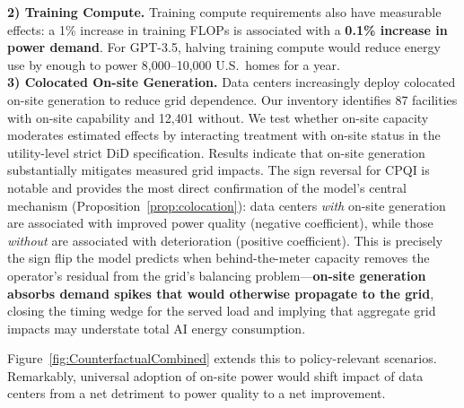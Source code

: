 \documentclass[a4paper,fleqn,longmktitle]{cas-sc}
\newcommand{\nb}[1]{\textcolor{blue}{NB[#1]}}
\theoremstyle{plain}
\theoremstyle{definition}
\begin{document}
\noindent\textbf{2) Training Compute.} Training compute requirements also have measurable effects: a 1\% increase in training FLOPs is associated with a \textbf{0.1\% increase in power demand}. For GPT-3.5, halving training compute would reduce energy use by enough to power 8,000--10,000 U.S.\ homes for a year.\\

\noindent\textbf{3) Colocated On-site Generation.} Data centers increasingly deploy colocated on-site generation to reduce grid dependence. Our inventory identifies 87 facilities with on-site capability and 12,401 without. We test whether on-site capacity moderates estimated effects by interacting treatment with on-site status in the utility-level strict DiD specification. Results indicate that on-site generation substantially mitigates measured grid impacts. The sign reversal for CPQI is notable and provides the most direct confirmation of the model's central mechanism (Proposition~\ref{prop:colocation}): data centers \textit{with} on-site generation are associated with improved power quality (negative coefficient), while those \textit{without} are associated with deterioration (positive coefficient). This is precisely the sign flip the model predicts when behind-the-meter capacity removes the operator's residual from the grid's balancing problem---\textbf{on-site generation absorbs demand spikes that would otherwise propagate to the grid}, closing the timing wedge for the served load and implying that aggregate grid impacts may understate total AI energy consumption.

Figure~\ref{fig:CounterfactualCombined} extends this to policy-relevant scenarios. Remarkably, universal adoption of on-site power would shift impact of data centers from a net detriment to power quality to a net improvement.\\

\end{document}
